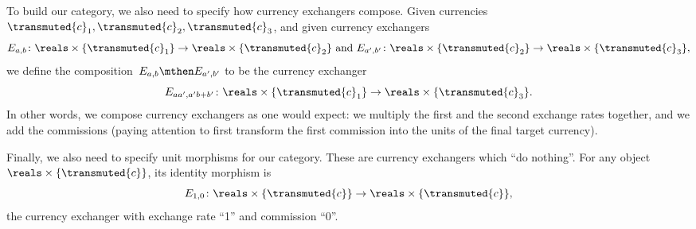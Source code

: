 To build our category, we also need to specify how currency exchangers compose. Given currencies~$\transmuted{c}_1, \transmuted{c}_2, \transmuted{c}_3$, and given currency exchangers
\begin{equation*}
  E_{a,b} \colon \reals \times \{\transmuted{c}_1 \} \to \reals \times \{ \transmuted{c}_2\}
   \text{ and }
  E_{a',b'} \colon \reals \times \{\transmuted{c}_2\} \to \reals \times \{\transmuted{c}_3\},
\end{equation*}
we define the composition~$E_{a,b} \mthen E_{a',b'}$ to be the currency exchanger
\begin{equation}
  \label{eq:comp-law-curr}
  E_{aa',a'b + b'} \colon \reals \times \{\transmuted{c}_1\} \to \reals \times \{\transmuted{c}_3\}.
\end{equation}
In other words, we compose currency exchangers as one would expect: we multiply the first and the second exchange rates together, and we add the commissions (paying attention to first transform the first commission into the units of the final target currency).

Finally, we also need to specify unit morphisms for our category. These are currency exchangers which ``do nothing''. For any object~$\reals \times \{ \transmuted{c}\}$, its identity morphism is
\begin{equation*}
  E_{1,0} \colon \reals \times \{\transmuted{c}\} \to \reals \times \{\transmuted{c}\},
\end{equation*}
the currency exchanger with exchange rate ``1'' and commission ``0''.

